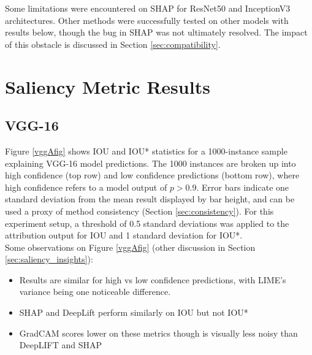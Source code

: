 \documentclass[main]{subfiles}
\begin{document}
Some limitations were encountered on SHAP for ResNet50 and InceptionV3 architectures. Other methods were successfully tested on other models with results below, though the bug in SHAP was not ultimately resolved. The impact of this obstacle is discussed in Section \ref{sec:compatibility}.

\section{Saliency Metric Results}
\subsection{VGG-16} \label{sec:vggExp}

Figure \ref{vggAfig} shows IOU and IOU* statistics for a 1000-instance sample explaining VGG-16 model predictions. The 1000 instances are broken up into high confidence (top row) and low confidence predictions (bottom row), where high confidence refers to a model output of $p>0.9$. Error bars indicate one standard deviation from the mean result displayed by bar height, and can be used a proxy of method consistency (Section \ref{sec:consistency}). For this experiment setup, a threshold of 0.5 standard deviations was applied to the attribution output for IOU and 1 standard deviation for IOU*.\\

\vspace{0.2in}
Some observations on Figure \ref{vggAfig} (other discussion in Section \ref{sec:saliency_insights}):
\begin{itemize}
\item Results are similar for high vs low confidence predictions, with LIME's variance being one noticeable difference.
\item SHAP and DeepLift perform similarly on IOU but not IOU*
\item GradCAM scores lower on these metrics though is visually less noisy than DeepLIFT and SHAP
\end{itemize}


\newpage

\end{document}
